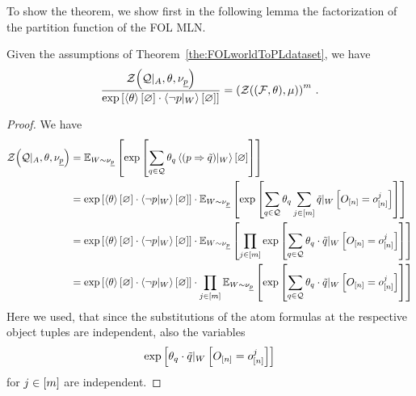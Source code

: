 To show the theorem, we show first in the following lemma the factorization of the partition function of the FOL MLN.

\begin{lemma}\label{lem:FOLpartitionfunctionfactorization}
	Given the assumptions of Theorem~\ref{the:FOLworldToPLdataset}, we have
	\begin{align*}
		\frac{\mathcal{Z}{\left(\mathcal{Q} |_{A},\theta , \nu_{\underline{p}}\right)}}{\mathrm{exp}\left[\left\langle \theta\right\rangle \left[ \varnothing \right] \cdot \left\langle {\lnot p}|_{W}\right\rangle \left[ \varnothing \right]\right]} = \left(\mathcal{Z}{\left((\mathcal{F},\theta),\mu\right)}\right)^m \, .
	\end{align*}
\end{lemma}
\begin{proof}
	We have
	\begin{align*}
		\mathcal{Z}{\left(\mathcal{Q} |_{A},\theta , \nu_{\underline{p}}\right)} 
		&= \mathbb{E}_{W\sim\nu_{\underline{p}}}\left[
			 \mathrm{exp}\left[\sum_{q\in\mathcal{Q}}\theta_{q}\left\langle {(p\Rightarrow\tilde{q})}|_{W}\right\rangle \left[ \varnothing \right]\right] 
		\right] \\
		&= \mathrm{exp}\left[\left\langle \theta\right\rangle \left[ \varnothing \right] \cdot \left\langle {\lnot p}|_{W}\right\rangle \left[ \varnothing \right]\right] \cdot 
		\mathbb{E}_{W\sim\nu_{\underline{p}}}\left[
			 \mathrm{exp}\left[\sum_{q\in\mathcal{Q}}\theta_{q}  \sum_{j\in[m]} {\tilde{q}}|_{W} \left[O_{[n]} = o_{[n]}^{j}\right] \right] 
		\right] \\
		&= \mathrm{exp}\left[\left\langle \theta\right\rangle \left[ \varnothing \right] \cdot \left\langle {\lnot p}|_{W}\right\rangle \left[ \varnothing \right]\right] \cdot 
		\mathbb{E}_{W\sim\nu_{\underline{p}}}\left[
			\prod_{j\in[m]} \mathrm{exp}\left[ \sum_{q\in\mathcal{Q}} \theta_{q} \cdot {\tilde{q}}|_{W} \left[O_{[n]} = o_{[n]}^{j}\right] \right] 
		\right] \\
		&= \mathrm{exp}\left[\left\langle \theta\right\rangle \left[ \varnothing \right] \cdot \left\langle {\lnot p}|_{W}\right\rangle \left[ \varnothing \right]\right] \cdot 
			\prod_{j\in[m]} 
			 \mathbb{E}_{W\sim\nu_{\underline{p}}}\left[
			 \mathrm{exp}\left[ \sum_{q\in\mathcal{Q}} \theta_{q} \cdot {\tilde{q}}|_{W} \left[O_{[n]} = o_{[n]}^{j}\right] \right] 
		\right] \\
	\end{align*}
	Here we used, that since the substitutions of the atom formulas at the respective object tuples are independent, also the variables
		\[ \mathrm{exp}\left[\theta_{q}  \cdot {\tilde{q}}|_{W} \left[O_{[n]} = o_{[n]}^{j}\right]  \right] \]
	for $j\in[m]$ are independent.
	

\end{proof}

